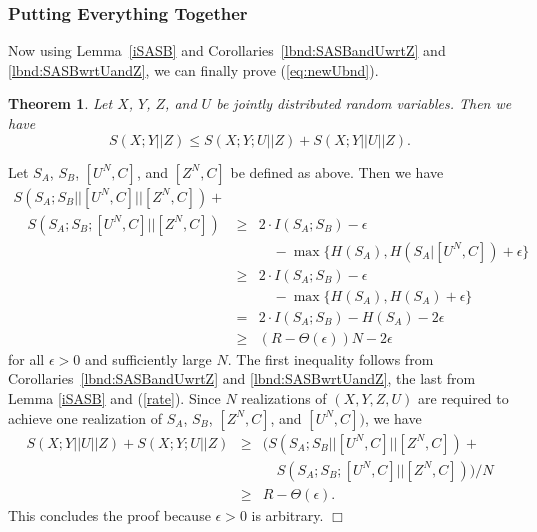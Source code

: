 \documentclass[a4paper, twoside, openany]{report}
\newcommand{\srate}{S(X;Y||Z)}
\newcommand{\eps}{\epsilon}
\theoremstyle{plain}
\newtheorem{theorem}{Theorem}
\theoremstyle{definition}
\newcommand{\proofend}{\hspace*{\fill} $\Box$\\}
\begin{document}
\subsubsection{Putting Everything Together}

Now using Lemma~\ref{iSASB} and Corollaries~\ref{lbnd:SASBandUwrtZ} and \ref{lbnd:SASBwrtUandZ}, we can finally prove (\ref{eq:newUbnd}).

\begin{theorem} \label{AliceBobMaxLoss}
Let $X$, $Y$, $Z$, and $U$ be jointly distributed random variables. Then we have
\[\srate \leq S(X;Y;U||Z) + S(X;Y||U||Z).\]
\end{theorem}

\proof
Let $S_A$, $S_B$, $[U^N,C]$, and $[Z^N,C]$ be defined as above. Then we have
\begin{eqnarray*}
S(S_A;S_B||[U^N,C]||[Z^N,C]) + \\
\quad S(S_A;S_B;[U^N,C]||[Z^N,C]) & \geq & 2 \cdot I(S_A;S_B) - \eps \\
                                  &      & \quad - \max\{H(S_A), H(S_A|[U^N,C]) + \eps\} \\
                                  & \geq & 2 \cdot I(S_A;S_B) - \eps \\
                                  &      & \quad - \max\{H(S_A), H(S_A) + \eps\} \\
                                  &   =  & 2 \cdot I(S_A;S_B) - H(S_A) - 2\eps \\
                                  & \geq & (R - \Theta(\eps))N - 2\eps
\end{eqnarray*}
for all $\eps > 0$ and sufficiently large $N$. The first inequality follows from Corollaries~\ref{lbnd:SASBandUwrtZ} and \ref{lbnd:SASBwrtUandZ}, the last from Lemma \ref{iSASB} and (\ref{rate}). Since $N$ realizations of $(X,Y,Z,U)$ are required to achieve one realization of $S_A$, $S_B$, $[Z^N,C]$, and $[U^N,C])$, we have
\begin{eqnarray*}
S(X;Y||U||Z) + S(X;Y;U||Z) & \geq & (S(S_A;S_B||[U^N,C]||[Z^N,C]) + \\
                           &      & \quad S(S_A;S_B;[U^N,C]||[Z^N,C]))/N \\
                           & \geq & R - \Theta(\eps).
\end{eqnarray*}
This concludes the proof because $\eps > 0$ is arbitrary.
\proofend

\end{document}
